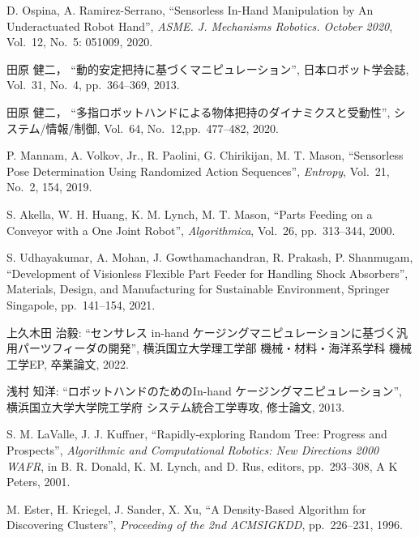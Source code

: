 \documentclass[a4paper,twoside,12pt,papersize, dvipdfmx]{iirthesis}
\begin{document}
\begin{thebibliography}{}
	D. Ospina, A. Ramirez-Serrano,
  	``Sensorless In-Hand Manipulation by An Underactuated Robot Hand'',
  	 {\it ASME. J. Mechanisms Robotics. October 2020},
  	 Vol.~12, No.~5: 051009, 
  	2020.

	田原 健二，
  	``動的安定把持に基づくマニピュレーション'',
  	 日本ロボット学会誌,
  	 Vol.~31, No.~4, pp.~364--369,
  	2013.  	

    	田原 健二，
  	``多指ロボットハンドによる物体把持のダイナミクスと受動性'',
  	 システム/情報/制御,
  	 Vol.~64, No.~12,pp.~477--482,
  	2020. 
  	
  	P. Mannam, A. Volkov, Jr., R. Paolini, G. Chirikijan, M. T. Mason,
  	``Sensorless Pose Determination Using Randomized Action Sequences'',
  	 {\it Entropy}, Vol.~21, No.~2, 154, 
  	2019.
  	
  	S. Akella, W. H. Huang, K. M. Lynch, M. T. Mason,
  	``Parts Feeding on a Conveyor with a One Joint Robot'',
  	 {\it Algorithmica},
  	 Vol.~26,
  	 pp.~313--344,
  	2000.
  	
  	S. Udhayakumar, A. Mohan, J. Gowthamachandran,  R. Prakash, P. Shanmugam,
  	``Development of Visionless Flexible Part Feeder for Handling Shock Absorbers'',
  	 Materials, Design, and Manufacturing for Sustainable Environment, Springer Singapole, 
  	 pp.~141--154,
  	2021.  	
  	
上久木田 治毅:
``センサレス in-hand ケージングマニピュレーションに基づく汎用パーツフィーダの開発'', 
横浜国立大学理工学部 機械・材料・海洋系学科 機械工学EP, 卒業論文, 2022.
  	
浅村 知洋:
``ロボットハンドのためのIn-hand ケージングマニピュレーション'', 
横浜国立大学大学院工学府 システム統合工学専攻, 修士論文, 2013.

  	S. M. LaValle, J. J. Kuffner, 
  	``Rapidly-exploring Random Tree: Progress and Prospects'', 
  	{\it Algorithmic and Computational Robotics: New Directions 2000 WAFR}, 
  	in B. R. Donald, K. M. Lynch, and D. Rus, editors, 
  	pp.~293--308, A K Peters, 2001.
  	
  	M. Ester, H. Kriegel, J. Sander, X. Xu, 
  	``A Density-Based Algorithm for Discovering Clusters'', 
  	{\it Proceeding of the 2nd ACMSIGKDD}, 
  	pp.~226--231, 1996.
  	

\end{thebibliography}
\end{document}

